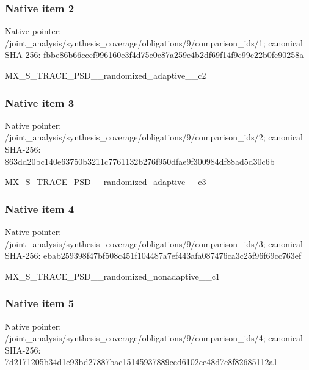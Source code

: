\documentclass[10pt,a4paper]{article}
\begin{document}
\subsubsection{Native item 2}
Native pointer: /joint\_\allowbreak{}analysis/synthesis\_\allowbreak{}coverage/obligations/9/comparison\_\allowbreak{}ids/1; canonical SHA-256: fbbe86b66ceef996160e3f4d75e0c87a259e4b2df69f14f9c99c22b0fe90258a

\begingroup\raggedright\sloppy MX\_\allowbreak{}S\_\allowbreak{}TRACE\_\allowbreak{}PSD\_\allowbreak{}\_\allowbreak{}randomized\_\allowbreak{}adaptive\_\allowbreak{}\_\allowbreak{}c2\par\endgroup

\subsubsection{Native item 3}
Native pointer: /joint\_\allowbreak{}analysis/synthesis\_\allowbreak{}coverage/obligations/9/comparison\_\allowbreak{}ids/2; canonical SHA-256: 863dd20bc140e63750b3211c7761132b276f950dfae9f300984df88ad5d30c6b

\begingroup\raggedright\sloppy MX\_\allowbreak{}S\_\allowbreak{}TRACE\_\allowbreak{}PSD\_\allowbreak{}\_\allowbreak{}randomized\_\allowbreak{}adaptive\_\allowbreak{}\_\allowbreak{}c3\par\endgroup

\subsubsection{Native item 4}
Native pointer: /joint\_\allowbreak{}analysis/synthesis\_\allowbreak{}coverage/obligations/9/comparison\_\allowbreak{}ids/3; canonical SHA-256: ebab259398f47bf508c451f104487a7ef443afa087476ca3c25f96f69cc763ef

\begingroup\raggedright\sloppy MX\_\allowbreak{}S\_\allowbreak{}TRACE\_\allowbreak{}PSD\_\allowbreak{}\_\allowbreak{}randomized\_\allowbreak{}nonadaptive\_\allowbreak{}\_\allowbreak{}c1\par\endgroup

\subsubsection{Native item 5}
Native pointer: /joint\_\allowbreak{}analysis/synthesis\_\allowbreak{}coverage/obligations/9/comparison\_\allowbreak{}ids/4; canonical SHA-256: 7d2171205b34d1e93bd27887bac15145937889ced6102ce48d7c8f82685112a1
\end{document}
